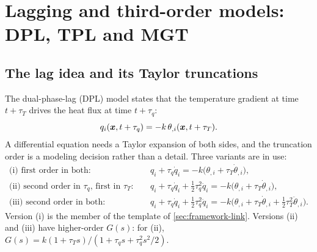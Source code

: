 \section{Lagging and third-order models: DPL, TPL and MGT}\label{sec:lags}
\subsection{The lag idea and its Taylor truncations}
The dual-phase-lag (DPL) model \citep{Tzou1995,Tzou1997} states that the temperature gradient at time $t+\tau_T$ drives the heat flux at time $t+\tau_q$:
\begin{equation}
q_i(\bm x,t+\tau_q)=-k\,\theta_{,i}(\bm x,t+\tau_T).\label{eq:lag}
\end{equation}
A differential equation needs a Taylor expansion of both sides, and the truncation order is a modeling decision rather than a detail. Three variants are in use:
\begin{align}
\text{(i) first order in both:}\quad & q_i+\tau_q\dot q_i=-k\bigl(\theta_{,i}+\tau_T\dot\theta_{,i}\bigr),\label{eq:dpl1}\\
\text{(ii) second order in }\tau_q\text{, first in }\tau_T:\quad & q_i+\tau_q\dot q_i+\tfrac12\tau_q^2\ddot q_i=-k\bigl(\theta_{,i}+\tau_T\dot\theta_{,i}\bigr),\label{eq:dpl2}\\
\text{(iii) second order in both:}\quad & q_i+\tau_q\dot q_i+\tfrac12\tau_q^2\ddot q_i=-k\bigl(\theta_{,i}+\tau_T\dot\theta_{,i}+\tfrac12\tau_T^2\ddot\theta_{,i}\bigr).\label{eq:dpl3}
\end{align}
Version (i) is the member of the template of \cref{sec:framework-link}. Versions (ii) and (iii) have higher-order $G(s)$: for (ii), $G(s)=k(1+\tau_Ts)/(1+\tau_qs+\tau_q^2s^2/2)$.

